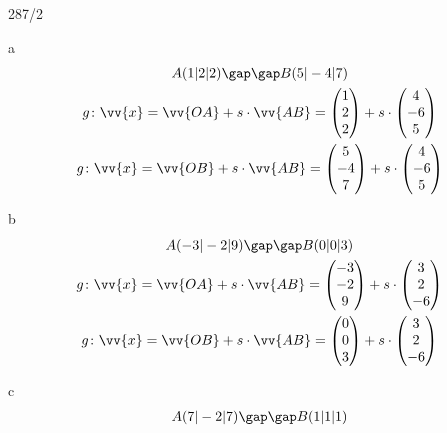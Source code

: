 \begin{exercise}{287/2}
  \item [a]
  \begin{gather*}
    A(1|2|2) \gap\gap B(5|-4|7) \\
    g \colon \vv{x} = \vv{OA} + s \cdot \vv{AB} = \begin{pmatrix}1 \\ 2 \\ 2\end{pmatrix} + s \cdot \begin{pmatrix}4 \\ -6 \\ 5\end{pmatrix} \\
    g \colon \vv{x} = \vv{OB} + s \cdot \vv{AB} = \begin{pmatrix}5 \\ -4 \\ 7\end{pmatrix} + s \cdot \begin{pmatrix}4 \\ -6 \\ 5\end{pmatrix}
  \end{gather*}
  \item [b]
  \begin{gather*}
    A(-3|-2|9) \gap\gap B(0|0|3) \\
    g \colon \vv{x} = \vv{OA} + s \cdot \vv{AB} = \begin{pmatrix}-3 \\ -2 \\ 9\end{pmatrix} + s \cdot \begin{pmatrix}3 \\ 2 \\ -6\end{pmatrix} \\
    g \colon \vv{x} = \vv{OB} + s \cdot \vv{AB} = \begin{pmatrix}0 \\ 0 \\ 3\end{pmatrix} + s \cdot \begin{pmatrix}3 \\ 2 \\ -6\end{pmatrix}
  \end{gather*}
  \item [c]
  \begin{gather*}
    A(7|-2|7) \gap\gap B(1|1|1) \\

\end{gather*}
\end{exercise}
